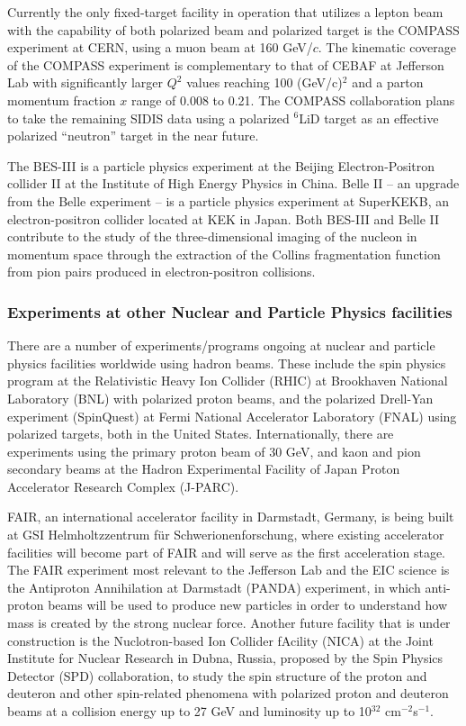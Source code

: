 Currently the only fixed-target facility in operation that utilizes a lepton beam with the capability of both polarized beam and polarized target is the COMPASS experiment at CERN, using a muon beam at 160 GeV/$c$. The kinematic coverage of the COMPASS experiment is complementary to that of CEBAF at Jefferson Lab with significantly larger $Q^2$ values reaching 100 (GeV/c)$^2$ and a parton momentum fraction $x$ range of 0.008 to 0.21. The COMPASS collaboration plans to take the remaining SIDIS data using a polarized $^6$LiD target as an effective polarized ``neutron'' target in the near future.

The BES-III is a particle physics experiment at the Beijing Electron-Positron collider II at the Institute of High Energy Physics in China. Belle II -- an upgrade from the Belle experiment -- is a particle physics experiment at SuperKEKB, an electron-positron collider located at KEK in Japan. Both BES-III and Belle II contribute to the study of the three-dimensional imaging of the nucleon in momentum space through the extraction of the Collins fragmentation function from pion pairs produced in electron-positron collisions.

\subsubsection{Experiments at other Nuclear and Particle Physics facilities}

There are a number of experiments/programs ongoing at nuclear and particle physics facilities worldwide using hadron beams. These include the spin physics program at the Relativistic Heavy Ion Collider (RHIC) at Brookhaven National Laboratory (BNL) with polarized proton beams, and the polarized Drell-Yan experiment (SpinQuest) at Fermi National Accelerator Laboratory (FNAL) using polarized targets, both in the United States. Internationally, there are experiments using the primary proton beam of 30 GeV, and kaon and pion secondary beams at the Hadron Experimental Facility of Japan Proton Accelerator Research Complex (J-PARC). 

FAIR, an international accelerator facility in Darmstadt, Germany, is being built at GSI Helmholtzzentrum für Schwerionenforschung, where existing accelerator facilities will become part of FAIR and will serve as the first acceleration stage. The  FAIR experiment most relevant to the Jefferson Lab and the EIC science is the Antiproton Annihilation at Darmstadt (PANDA) experiment, in which anti-proton beams will be used to produce new particles in order to understand how mass is created by the strong nuclear force. 
Another future facility that is under construction is the Nuclotron-based Ion Collider fAcility (NICA) at the Joint Institute for Nuclear Research in Dubna, Russia, proposed by the Spin Physics Detector (SPD) collaboration, to study the spin structure of the proton and deuteron and other spin-related phenomena with polarized proton and deuteron beams at a collision energy up to 27 GeV and luminosity up to 10$^{32}$ cm$^{-2}$s$^{-1}$. 

